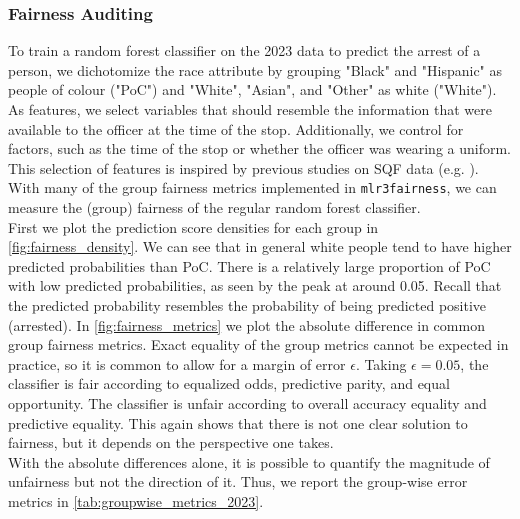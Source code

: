 \subsubsection*{Fairness Auditing}
To train a random forest classifier on the 2023 data to predict the arrest of a person, we dichotomize the race attribute by grouping "Black" and "Hispanic" as people of colour ("PoC") and "White", "Asian", and "Other" as white ("White").
As features, we select variables that should resemble the information that were available to the officer at the time of the stop. Additionally, we control for factors, such as the time of the stop or whether the officer was wearing a uniform. This selection of features is inspired by previous studies on SQF data (e.g. \cite{goel2016}). With many of the group fairness metrics implemented in \texttt{mlr3fairness}, we can measure the (group) fairness of the regular random forest classifier.\\
First we plot the prediction score densities for each group in \autoref{fig:fairness_density}. We can see that in general white people tend to have higher predicted probabilities than PoC. There is a relatively large proportion of PoC with low predicted probabilities, as seen by the peak at around 0.05. Recall that the predicted probability resembles the probability of being predicted positive (arrested).
In \autoref{fig:fairness_metrics} we plot the absolute difference in common group fairness metrics.
Exact equality of the group metrics cannot be expected in practice, so it is common to allow for a margin of error $\epsilon$. Taking $\epsilon = 0.05$, the classifier is fair according to equalized odds, predictive parity, and equal opportunity. The classifier is unfair according to overall accuracy equality and predictive equality. This again shows that there is not one clear solution to fairness, but it depends on the perspective one takes.\\
With the absolute differences alone, it is possible to quantify the magnitude of unfairness but not the direction of it. Thus, we report the group-wise error metrics in \autoref{tab:groupwise_metrics_2023}.
